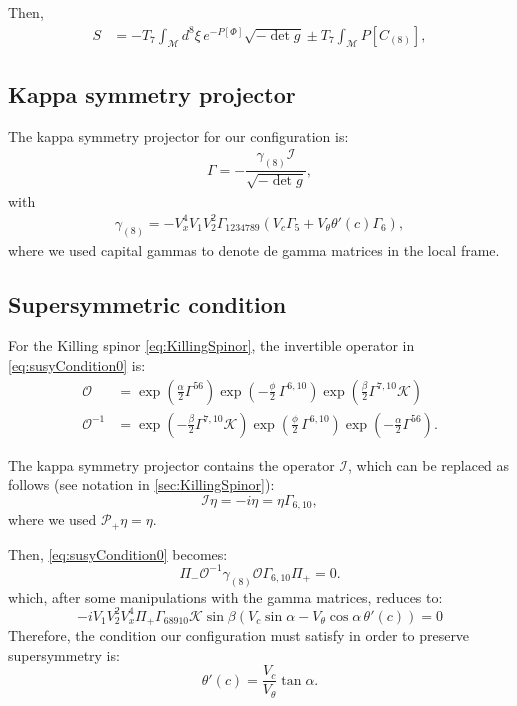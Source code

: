 Then,
\begin{align}
 S & = -T_7 \int_\mathcal{M} d^8\xi \, e^{-P[\Phi] } \sqrt{-\det g} \pm
 T_7\int _\mathcal{M} P[C_{(8)}],
\end{align}

\subsection{Kappa symmetry projector}

The kappa symmetry projector for our configuration is:
\begin{align}
\Gamma = - \dfrac{ \gamma_{(8)} \mathcal{I} }{\sqrt{-\det g}},
\end{align}
with
\begin{align}
 \gamma_{(8)} = - V_x^4 V_1 V_2^2 \Gamma_{1 2 3 4 7 8 9}( V_c \Gamma_5 +  V_{\theta} \theta'(c) \Gamma_6), 
\end{align}
where we used capital gammas to denote de gamma matrices in the local frame. 


\subsection{Supersymmetric condition}
For the Killing spinor \eqref{eq:KillingSpinor}, the invertible operator in \eqref{eq:susyCondition0} is:
\begin{align}
 \mathcal{O} &= \exp{\left(\frac{\alpha}{2}\Gamma^{56} \right)} \exp{\left(-\frac{\phi}{2}\, \Gamma^{6,10} \right)} \exp{\left(\frac{\beta}{2}\Gamma^{7, 10} \mathcal{K} \right)} \\
 \mathcal{O}^{-1} &=  \exp{\left(-\frac{\beta}{2}\Gamma^{7, 10} \mathcal{K} \right)} 
 \exp{\left(\frac{\phi}{2}\, \Gamma^{6,10} \right)} 
 \exp{\left(-\frac{\alpha}{2}\Gamma^{56} \right)}.
\end{align}


The kappa symmetry projector contains the operator $\mathcal{I}$, which can be replaced as follows (see notation in \ref{sec:KillingSpinor}):
\begin{equation}
 \mathcal{I}\eta =-i \eta =\eta  \Gamma_{6,10},
\end{equation}
where we used $\mathcal{P}_+ \eta =\eta$. 

Then, \eqref{eq:susyCondition0} becomes:
\begin{equation}
 \Pi_{-} \mathcal{O}^{-1} \gamma_{(8)} \mathcal{O} \Gamma_{6,10} \Pi_{+}  = 0.
\end{equation}
which, after some manipulations with the gamma matrices, reduces to:
\begin{equation}
-i V_1 V_2^2 V_x^4 \Pi_+ \Gamma_{6 8 9 10} \mathcal{K} \sin\beta \left(V_c \sin\alpha - V_\theta \cos\alpha \, \theta'(c)\right) = 0
\end{equation}
Therefore, the condition our configuration must satisfy in order to preserve supersymmetry is:
\begin{equation}
 \boxed{\theta'(c) = \dfrac{V_c}{V_\theta} \tan\alpha}.
\end{equation}

